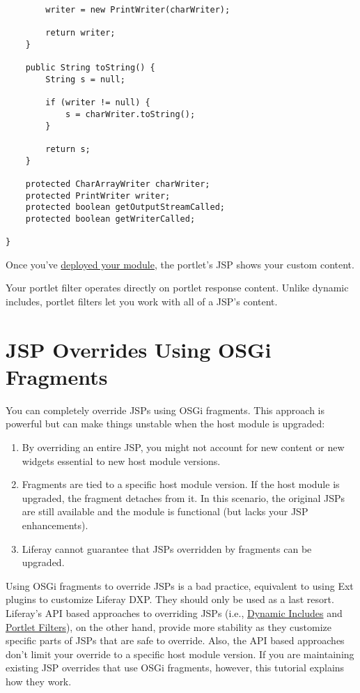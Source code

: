 \begin{enumerate}
\begin{verbatim}
        writer = new PrintWriter(charWriter);

        return writer;
    }

    public String toString() {
        String s = null;

        if (writer != null) {
            s = charWriter.toString();
        }

        return s;
    }

    protected CharArrayWriter charWriter;
    protected PrintWriter writer;
    protected boolean getOutputStreamCalled;
    protected boolean getWriterCalled;

}
\end{verbatim}
\end{enumerate}

Once you've
\href{/docs/7-2/reference/-/knowledge_base/r/deploying-a-project}{deployed
your module}, the portlet's JSP shows your custom content.

Your portlet filter operates directly on portlet response content.
Unlike dynamic includes, portlet filters let you work with all of a
JSP's content.

\chapter{JSP Overrides Using OSGi
Fragments}\label{jsp-overrides-using-osgi-fragments}

You can completely override JSPs using OSGi fragments. This approach is
powerful but can make things unstable when the host module is upgraded:

\begin{enumerate}
\def\labelenumi{\arabic{enumi}.}
\tightlist
\item
  By overriding an entire JSP, you might not account for new content or
  new widgets essential to new host module versions.
\item
  Fragments are tied to a specific host module version. If the host
  module is upgraded, the fragment detaches from it. In this scenario,
  the original JSPs are still available and the module is functional
  (but lacks your JSP enhancements).
\item
  Liferay cannot guarantee that JSPs overridden by fragments can be
  upgraded.
\end{enumerate}

Using OSGi fragments to override JSPs is a bad practice, equivalent to
using Ext plugins to customize Liferay DXP. They should only be used as
a last resort. Liferay's API based approaches to overriding JSPs (i.e.,
\href{/docs/7-2/customization/-/knowledge_base/c/customizing-jsps-with-dynamic-includes}{Dynamic
Includes} and
\href{/docs/7-2/customization/-/knowledge_base/c/jsp-overrides-using-portlet-filters}{Portlet
Filters}), on the other hand, provide more stability as they customize
specific parts of JSPs that are safe to override. Also, the API based
approaches don't limit your override to a specific host module version.
If you are maintaining existing JSP overrides that use OSGi fragments,
however, this tutorial explains how they work.

